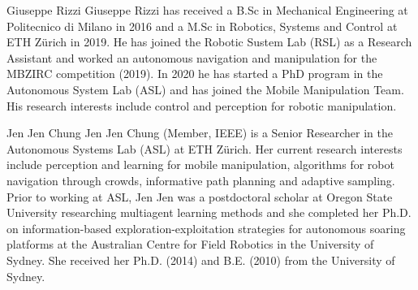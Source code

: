 \documentclass[journal]{IEEEtran}  %
\begin{document}
\begin{IEEEbiography}{Giuseppe Rizzi}
Giuseppe Rizzi has received a B.Sc in Mechanical Engineering at Politecnico di Milano in 2016 and a M.Sc in Robotics, Systems and Control at ETH Zürich in 2019. He has joined the Robotic Sustem Lab (RSL) as a Research Assistant and worked an autonomous navigation and manipulation for the MBZIRC competition (2019). In 2020 he has started a PhD program in the Autonomous System Lab (ASL) and has joined the Mobile Manipulation Team. His research interests include control and perception for robotic manipulation.  
\end{IEEEbiography}

\begin{IEEEbiography}{Jen Jen Chung}
Jen Jen Chung (Member, IEEE) is a Senior Researcher in the Autonomous Systems Lab (ASL) at ETH Zürich. Her current research interests include perception and learning for mobile manipulation, algorithms for robot navigation through crowds, informative path planning and adaptive sampling. Prior to working at ASL, Jen Jen was a postdoctoral scholar at Oregon State University researching multiagent learning methods and she completed her Ph.D. on information-based exploration-exploitation strategies for autonomous soaring platforms at the Australian Centre for Field Robotics in the University of Sydney. She received her Ph.D. (2014) and B.E. (2010) from the University of Sydney.
\end{IEEEbiography}
\end{document}
